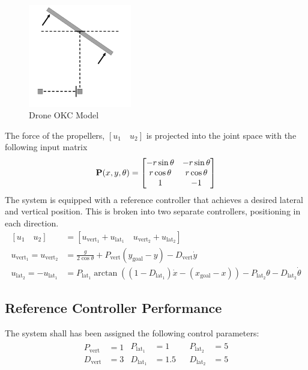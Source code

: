 \begin{figure}[H]
    \centering
    \includegraphics[width=0.4\textwidth]{Figures/Examples/Drone/DroneNE.png}
    \caption{Drone OKC Model}
    \label{fig:drone}
\end{figure}
\noindent The force of the propellers, $\left [ u_1 \quad u_2 \right ]$ is projected into the joint space with the following input matrix
\begin{align*}
    \P(x, y, \theta) = \begin{bmatrix}
    -r\sin{\theta} & -r\sin{\theta} \\ 
    r\cos{\theta} & r\cos{\theta} \\ 
    1 & -1 
    \end{bmatrix}
\end{align*}
\noindent The system is equipped with a reference controller that achieves a desired lateral and vertical position. This is broken into two separate controllers, positioning in each direction. 
\begin{align}
    \left [ u_1 \quad u_2 \right ] &= \left [u_{\text{vert}_1} + u_{\text{lat}_1} \quad u_{\text{vert}_2} + u_{\text{lat}_2}\right ] \\
    u_{\text{vert}_1} = u_{\text{vert}_2} &= \frac{g}{2 \cos{\theta}} + P_{\text{vert}} \left (y_{\text{goal}} -  y\right) - D_{\text{vert}}\dot{y} \\
    u_{\text{lat}_2} = -u_{\text{lat}_1} &= P_{\text{lat}_1}\arctan{\left ((1 - D_{\text{lat}_1})\dot{x} - (x_{\text{goal}} - x) \right )} -  P_{\text{lat}_2}\theta - D_{\text{lat}_2}\dot{\theta}
\end{align}
\subsection{Reference Controller Performance}

\noindent The system shall has been assigned the following control parameters:
\begin{align*}
\begin{split}
    P_{\text{vert}} &= 1 \\
    D_{\text{vert}} &= 3
\end{split}
\begin{split}
    P_{\text{lat}_1} &= 1 \\
    D_{\text{lat}_1} &= 1.5
\end{split}
\begin{split}
\end{split}
\begin{split}
    P_{\text{lat}_2} &= 5 \\
    D_{\text{lat}_2} &= 5
\end{split}
\end{align*}

